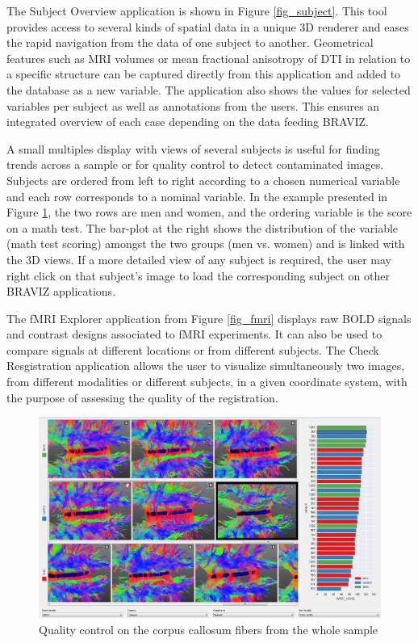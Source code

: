 \documentclass[twocolumn]{svjour3}
\begin{document}
The Subject Overview application is shown in Figure \ref{fig_subject}. This tool  provides access to several kinds of spatial data in a unique 3D renderer and eases the rapid navigation from the data of one subject to another. Geometrical features such as MRI volumes or mean fractional anisotropy of DTI in relation to a specific structure can be captured directly from this application and added to the database as a new variable. The application also shows the values for selected variables per subject as well as annotations from the users. This ensures an integrated overview of each case depending on the data feeding BRAVIZ.

A small multiples display \cite{tufte_visual_1983} with views  of several subjects is useful for finding trends across a sample or for quality control to detect contaminated images. Subjects are ordered from left to right according to a chosen numerical variable and each row corresponds to a nominal variable. In the example presented in Figure \ref{fig_sample}, the two rows are men and women, and the ordering variable is the score on a math test. The bar-plot at the right shows the distribution of the variable (math test scoring) amongst the two groups (men vs. women) and is linked with the 3D views. If a more detailed view of any subject is required, the user may right click on that subject’s image to load the corresponding subject on other BRAVIZ applications.

The fMRI Explorer application from Figure \ref{fig_fmri} displays raw BOLD signals and contrast designs associated to fMRI experiments. It can also be used to compare signals at different locations or from different subjects. The Check Resgistration application allows the user to visualize simultaneously two images, from different modalities or different subjects, in a given coordinate system, with the purpose of assessing the quality of the registration.

\begin{figure}
\begin{center}
\includegraphics[width=\linewidth]{quality_control_trim}
\end{center}
 \caption{\label{fig_sample} Quality control on the corpus callosum fibers from the whole sample}
\end{figure}
\end{document}
